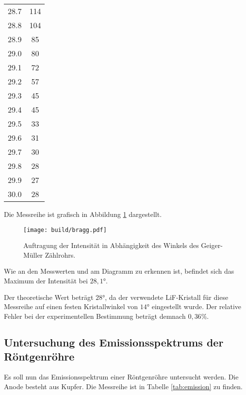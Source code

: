 \begin{table}[htp]
\begin{center}
\begin{tabular}{S[table-format=2.1] S[table-format=3.0]}
                        28.7 & 114\\
                        28.8 & 104\\
                        28.9 & 85\\
                        29.0 & 80\\
                        29.1 & 72\\
                        29.2 & 57\\
                        29.3 & 45\\
                        29.4 & 45\\
                        29.5 & 33\\
                        29.6 & 31\\
                        29.7 & 30\\
                        29.8 & 28\\
                        29.9 & 27\\
                        30.0 & 28\\
                \bottomrule
                \end{tabular}
        \end{center}
\end{table}

Die Messreihe ist grafisch in Abbildung \ref{fig:bragg} dargestellt.

\begin{figure}
  \centering
  \texttt{[image: build/bragg.pdf]}
  \caption{Auftragung der Intensität in Abhängigkeit des Winkels des Geiger-Müller Zählrohrs.}
  \label{fig:bragg}
\end{figure}

Wie an den Messwerten und am Diagramm zu erkennen ist, befindet sich das Maximum
der Intensität bei $28{,}1°$.

Der theoretische Wert beträgt $28°$, da der verwendete LiF-Kristall für diese Messreihe
auf einen festen Kristallwinkel von $14°$ eingestellt wurde. Der relative Fehler bei
der experimentellen Bestimmung beträgt demnach $0{,}36\%$.

\subsection{Untersuchung des Emissionsspektrums der Röntgenröhre}
\label{subsec:emission}

Es soll nun das Emissionsspektrum einer Röntgenröhre untersucht werden. Die Anode besteht aus
Kupfer. Die Messreihe ist in Tabelle \ref{tab:emission} zu finden.

